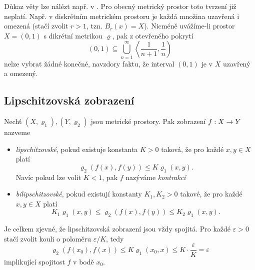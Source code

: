 Důkaz věty lze nálézt např. v \citep[str. 166]{NetukaAnalyza2014}. Pro obecný metrický prostor toto tvrzení již neplatí. Např. v diskrétním metrickém prostoru je každá množina uzavřená i omezená (stačí zvolit $r>1$, tzn. $B_r(x)=X$). Nicméně uvážíme-li prostor $X=(0,1)$ s dikrétní metrikou $\varrho$, pak z otevřeného pokrytí
\[(0,1)\subseteq\bigcup_{n=1}^\infty\left\langle\dfrac{1}{n+1},\dfrac{1}{n}\right)\]
nelze vybrat žádné konečné, navzdory faktu, že interval $(0,1)$ je v $X$ uzavřený a omezený.


\subsection{Lipschitzovská zobrazení}\label{subsec:lipschitzovska-zobrazeni}

\begin{definition}\label{def:bilipschitzovske-zobrazeni}
    Nechť $(X,\varrho_1),(Y,\varrho_2)$ jsou metrické prostory. Pak zobrazení $f:X \rightarrow Y$ nazveme 
    \begin{itemize}
        \item \emph{lipschitzovské}, pokud existuje konstanta $K>0$ taková, že pro každé $x,y\in X$ platí
        \[\varrho_2(f(x),f(y))\leqslant K\varrho_1(x,y).\]
        Navíc pokud lze volit $K<1$, pak $f$ nazýváme \emph{kontrakcí}
        \item \emph{bilipschitzovské}, pokud existují konstanty $K_1,K_2>0$ takové, že pro každé $x,y\in X$ platí
        \[K_1\varrho_1(x,y)\leqslant\varrho_2(f(x),f(y))\leqslant K_2\varrho_1(x,y).\]
    \end{itemize}
\end{definition}
Je celkem zjevné, že lipschitzovská zobrazení jsou vždy spojitá. Pro každé $\varepsilon>0$ stačí zvolit kouli o poloměru $\varepsilon/K$, tedy
\[\varrho_2(f(x_0),f(x))\leqslant K\varrho_1(x_0,x)\leqslant K\cdot\dfrac{\varepsilon}{K}=\varepsilon\]
implikující spojitost $f$ v bodě $x_0$.